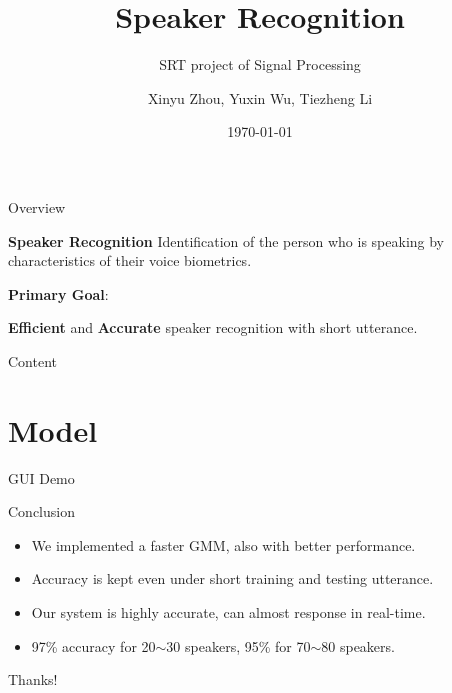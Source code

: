 \documentclass {beamer}
\title{Speaker Recognition}
\subtitle{SRT project of Signal Processing}
\author {Xinyu Zhou, Yuxin Wu, Tiezheng Li}
\institute{
  Department of Computer Science and Technology\\
  Tsinghua University\\
}
\date{\today}
\theoremstyle{plain}
\begin{document}
\frame[plain]{\titlepage}

\begin{frame}{Overview}
\begin{exampleblock}{\textbf{Speaker Recognition}}
  Identification of the person who is speaking by characteristics of their voice biometrics.
\end{exampleblock}
\textbf{Primary Goal}:

\textbf{Efficient} and \textbf{Accurate} speaker recognition with short utterance.


\end{frame}
\begin{frame}{Content}
\tableofcontents
\end{frame}



\section{Model}


%
\begin{frame}{GUI Demo}

\end{frame}
\begin{frame}{Conclusion}
  \begin{itemize}
      \item We implemented a faster GMM, also with better performance.
      \item Accuracy is kept even under short training and testing utterance.
      \item Our system is highly accurate, can almost response in real-time.
      \item 97\% accuracy for 20$\sim$30 speakers, 95\% for 70$\sim$80 speakers.
  \end{itemize}
\end{frame}
\begin{frame}{}
  \begin{center}
  \Huge Thanks!
\end{center}
\end{frame}
\end{document}
